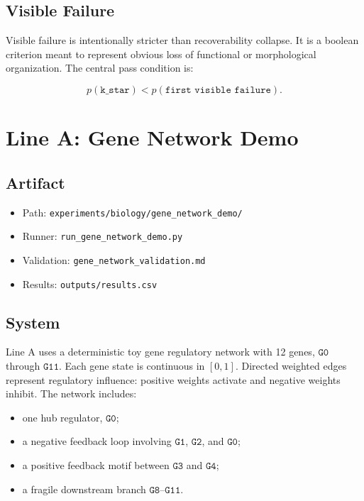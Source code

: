 \documentclass[11pt]{article}
\begin{document}
\subsection{Visible Failure}

Visible failure is intentionally stricter than recoverability collapse. It is a boolean criterion meant to represent obvious loss of functional or morphological organization. The central pass condition is:

\[
p(\texttt{k\_star}) < p(\texttt{first visible failure}).
\]

\section{Line A: Gene Network Demo}

\subsection{Artifact}

\begin{itemize}
\item Path: \texttt{experiments/biology/gene\_network\_demo/}
\item Runner: \texttt{run\_gene\_network\_demo.py}
\item Validation: \texttt{gene\_network\_validation.md}
\item Results: \texttt{outputs/results.csv}
\end{itemize}

\subsection{System}

Line A uses a deterministic toy gene regulatory network with 12 genes, \(\texttt{G0}\) through \(\texttt{G11}\). Each gene state is continuous in \([0,1]\). Directed weighted edges represent regulatory influence: positive weights activate and negative weights inhibit. The network includes:

\begin{itemize}
\item one hub regulator, \(\texttt{G0}\);
\item a negative feedback loop involving \(\texttt{G1}\), \(\texttt{G2}\), and \(\texttt{G0}\);
\item a positive feedback motif between \(\texttt{G3}\) and \(\texttt{G4}\);
\item a fragile downstream branch \(\texttt{G8--G11}\).
\end{itemize}
\end{document}
